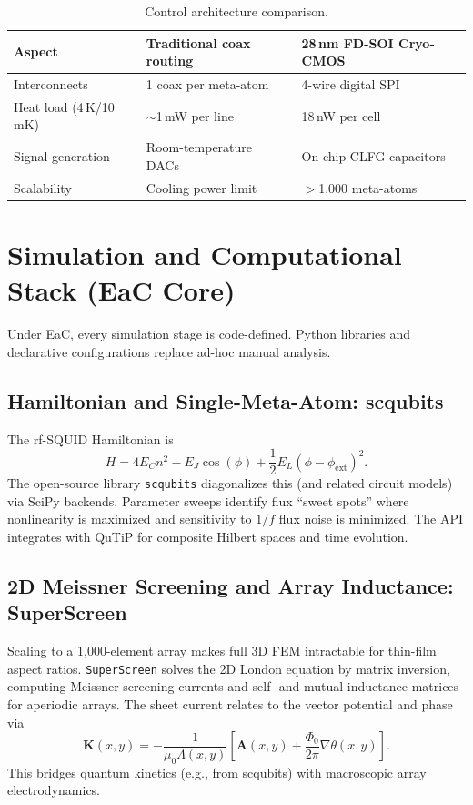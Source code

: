 \documentclass[11pt, a4paper]{article}
\begin{document}
\begin{table}[htbp]
\centering
\renewcommand{\arraystretch}{1.3}
\begin{tabular}{p{}p{}p{}}
\toprule
\textbf{Aspect} & \textbf{Traditional coax routing} & \textbf{28\,nm FD-SOI Cryo-CMOS} \\
\midrule
Interconnects & 1 coax per meta-atom & 4-wire digital SPI \\
Heat load (4\,K/10\,mK) & $\sim$1\,mW per line & 18\,nW per cell \\
Signal generation & Room-temperature DACs & On-chip CLFG capacitors \\
Scalability & Cooling power limit & $>$1,000 meta-atoms \\
\bottomrule
\end{tabular}
\caption{Control architecture comparison.}
\end{table}

\section{Simulation and Computational Stack (EaC Core)}

Under EaC, every simulation stage is code-defined. Python libraries and declarative configurations replace ad-hoc manual analysis.

\subsection{Hamiltonian and Single-Meta-Atom: scqubits}

The rf-SQUID Hamiltonian is
\begin{equation}
H = 4E_C n^2 - E_J \cos(\phi) + \frac{1}{2} E_L(\phi - \phi_{\mathrm{ext}})^2.
\end{equation}
The open-source library \texttt{scqubits} diagonalizes this (and related circuit models) via SciPy backends. Parameter sweeps identify flux ``sweet spots'' where nonlinearity is maximized and sensitivity to $1/f$ flux noise is minimized. The API integrates with QuTiP for composite Hilbert spaces and time evolution.

\subsection{2D Meissner Screening and Array Inductance: SuperScreen}

Scaling to a 1,000-element array makes full 3D FEM intractable for thin-film aspect ratios. \texttt{SuperScreen} solves the 2D London equation by matrix inversion, computing Meissner screening currents and self- and mutual-inductance matrices for aperiodic arrays. The sheet current relates to the vector potential and phase via
\begin{equation}
\mathbf{K}(x,y) = -\frac{1}{\mu_0 \Lambda(x,y)} \left[ \mathbf{A}(x,y) + \frac{\Phi_0}{2\pi} \nabla\theta(x,y) \right].
\end{equation}
This bridges quantum kinetics (e.g., from scqubits) with macroscopic array electrodynamics.
\end{document}
